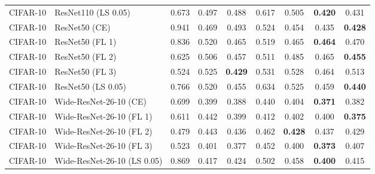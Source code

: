 \begin{table}[h!]
{\begin{tabular}{llccccccc}
    CIFAR-10 &         ResNet110 (LS 0.05) &         0.673 &                  0.497 &                  0.488 &                  0.617 &                  0.505 & \textbf{0.420} &                  0.431 \\
    CIFAR-10 &               ResNet50 (CE) &         0.941 &                  0.469 &                  0.493 &                  0.524 &                  0.454 &                  0.435 & \textbf{0.428} \\
    CIFAR-10 &             ResNet50 (FL 1) &         0.836 &                  0.520 &                  0.465 &                  0.519 &                  0.465 & \textbf{0.464} &                  0.470 \\
    CIFAR-10 &             ResNet50 (FL 2) &         0.625 &                  0.506 &                  0.457 &                  0.511 &                  0.485 &                  0.465 & \textbf{0.455} \\
    CIFAR-10 &             ResNet50 (FL 3) &         0.524 &                  0.525 & \textbf{0.429} &                  0.531 &                  0.528 &                  0.464 &                  0.513 \\
    CIFAR-10 &          ResNet50 (LS 0.05) &         0.766 &                  0.520 &                  0.455 &                  0.634 &                  0.525 &                  0.459 & \textbf{0.440} \\
    CIFAR-10 &      Wide-ResNet-26-10 (CE) &         0.699 &                  0.399 &                  0.388 &                  0.440 &                  0.404 & \textbf{0.371} &                  0.382 \\
    CIFAR-10 &    Wide-ResNet-26-10 (FL 1) &         0.611 &                  0.442 &                  0.399 &                  0.412 &                  0.402 &                  0.400 & \textbf{0.375} \\
    CIFAR-10 &    Wide-ResNet-26-10 (FL 2) &         0.479 &                  0.443 &                  0.436 &                  0.462 & \textbf{0.428} &                  0.437 &                  0.429 \\
    CIFAR-10 &    Wide-ResNet-26-10 (FL 3) &         0.523 &                  0.401 &                  0.377 &                  0.452 &                  0.400 & \textbf{0.373} &                  0.407 \\
    CIFAR-10 & Wide-ResNet-26-10 (LS 0.05) &         0.869 &                  0.417 &                  0.424 &                  0.502 &                  0.458 & \textbf{0.400} &                  0.415 \\

\end{tabular}}
\end{table}
